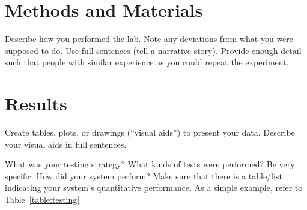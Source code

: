 \documentclass[conference,a4paper]{IEEEtran}
\begin{document}
%



\section{Methods and Materials}\label{sec:methodsnmaterials}
Describe how you performed the lab.
Note any deviations from what you were supposed to do.
Use full sentences (tell a narrative story).
Provide enough detail such that people with similar experience as you could repeat the experiment.

\section{Results}\label{sec:results}
Create tables, plots, or drawings (“visual aids”) to present your data.
Describe your visual aids in full sentences.

What was your testing strategy?  What kinds of tests were performed?
Be very specific.
How did your system perform?
Make sure that there is a table/list indicating your system's quantitative performance.
As a simple example, refer to Table~\ref{table:testing}
\end{document}
